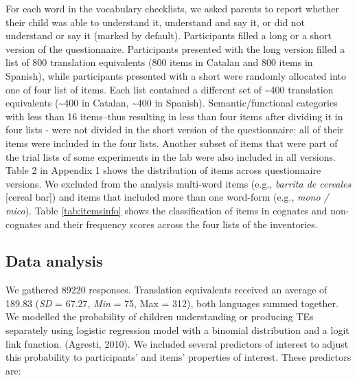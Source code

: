 \documentclass[
  english,
  man,man,floatsintext]{apa6}
\begin{document}
For each word in the vocabulary checklists, we asked parents to report whether their child was able to understand it, understand and say it, or did not understand or say it (marked by default). Participants filled a long or a short version of the questionnaire. Participants presented with the long version filled a list of 800 translation equivalents (800 items in Catalan and 800 items in Spanish), while participants presented with a short were randomly allocated into one of four list of items. Each list contained a different set of \textasciitilde400 translation equivalents (\textasciitilde400 in Catalan, \textasciitilde400 in Spanish). Semantic/functional categories with less than 16 items--thus resulting in less than four items after dividing it in four lists - were not divided in the short version of the questionnaire: all of their items were included in the four lists. Another subset of items that were part of the trial lists of some experiments in the lab were also included in all versions. Table 2 in Appendix 1 shows the distribution of items across questionnaire versions. We excluded from the analysis multi-word items (e.g., \emph{barrita de cereales} {[}cereal bar{]}) and items that included more than one word-form (e.g., \emph{mono / mico}). Table \ref{tab:itemsinfo} shows the classification of items in cognates and non-cognates and their frequency scores across the four lists of the inventories.

\hypertarget{data-analysis}{%
\subsection{Data analysis}\label{data-analysis}}

We gathered 89220 responses. Translation equivalents received an average of 189.83 (\emph{SD} = 67.27, \emph{Min} = 75, Max = 312), both languages summed together. We modelled the probability of children understanding or producing TEs separately using logistic regression model with a binomial distribution and a logit link function. (Agresti, 2010). We included several predictors of interest to adjust this probability to participants' and items' properties of interest. These predictors are:
\end{document}
